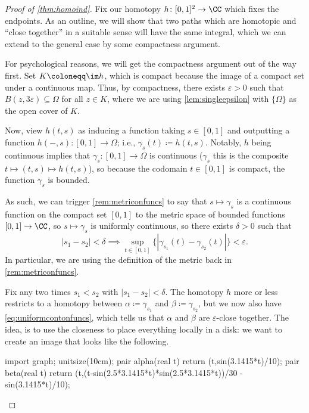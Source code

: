 \documentclass[../notes.tex]{subfiles}
\begin{document}
\begin{proof}[Proof of \autoref{thm:homoind}]
	Fix our homotopy $h\colon [0,1]^2\to\CC$ which fixes the endpoints. As an outline, we will show that two paths which are homotopic and ``close together'' in a suitable sense will have the same integral, which we can extend to the general case by some compactness argument.
	
	For psychological reasons, we will get the compactness argument out of the way first. Set $K\coloneqq \im h$, which is compact because the image of a compact set under a continuous map. Thus, by compactness, there exists $\varepsilon>0$ such that $B(z,3\varepsilon)\subseteq\Omega$ for all $z\in K$, where we are using \autoref{lem:singleepsilon} with $\{\Omega\}$ as the open cover of $K$.

	Now, view $h(t,s)$ as inducing a function taking $s\in[0,1]$ and outputting a function $h(-,s)\colon [0,1]\to\Omega$; i.e., $\gamma_s(t)\coloneqq h(t,s)$. Notably, $h$ being continuous implies that $\gamma_s\colon [0,1]\to\Omega$ is continuous ($\gamma_s$ this is the composite $t\mapsto(t,s)\mapsto h(t,s)$), so because the codomain $t\in[0,1]$ is compact, the function $\gamma_s$ is bounded.
	
	As such, we can trigger \autoref{rem:metriconfuncs} to say that $s\mapsto\gamma_s$ is a continuous function on the compact set $[0,1]$ to the metric space of bounded functions $[0,1]\to\CC$, so $s\mapsto\gamma_s$ is uniformly continuous, so there exists $\delta>0$ such that
	\[|s_1-s_2|<\delta\implies\sup_{t\in[0,1]}\{|\gamma_{s_1}(t)-\gamma_{s_2}(t)|\}<\varepsilon.\tag{$*$}\label{eq:uniformcontonfuncs}\]
	In particular, we are using the definition of the metric back in \autoref{rem:metriconfuncs}.

	Fix any two times $s_1<s_2$ with $|s_1-s_2|<\delta$. The homotopy $h$ more or less restricts to a homotopy between $\alpha\coloneqq \gamma_{s_1}$ and $\beta\coloneqq \gamma_{s_2}$, but we now also have \autoref{eq:uniformcontonfuncs}, which tells us that $\alpha$ and $\beta$ are $\varepsilon$-close together. The idea, is to use the closeness to place everything locally in a disk: we want to create an image that looks like the following.
	\begin{center}
		\begin{asy}
			import graph;
			unitsize(10cm);
			pair alpha(real t)
			{
				return (t,sin(3.1415*t)/10);
			}
			pair beta(real t)
			{
				return (t,(t-sin(2.5*3.1415*t)*sin(2.5*3.1415*t))/30 - sin(3.1415*t)/10);
			}
	

\end{asy}
\end{center}
\end{proof}
\end{document}
